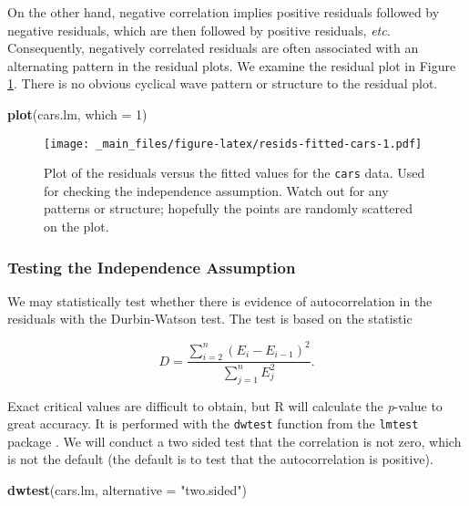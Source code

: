 \documentclass[]{book}
\newenvironment{Shaded}{\begin{snugshade}}{\end{snugshade}}
\newcommand{\KeywordTok}[1]{\textcolor[rgb]{0.13,0.29,0.53}{\textbf{{#1}}}}
\newcommand{\DataTypeTok}[1]{\textcolor[rgb]{0.13,0.29,0.53}{{#1}}}
\newcommand{\DecValTok}[1]{\textcolor[rgb]{0.00,0.00,0.81}{{#1}}}
\newcommand{\StringTok}[1]{\textcolor[rgb]{0.31,0.60,0.02}{{#1}}}
\newcommand{\NormalTok}[1]{{#1}}
\numberwithin{equation}{chapter}
\numberwithin{figure}{chapter}
\theoremstyle{plain}
\theoremstyle{definition}
\theoremstyle{remark}
\theoremstyle{definition}
\theoremstyle{definition}
\theoremstyle{remark}
\begin{document}
On the other hand, negative correlation implies positive residuals
followed by negative residuals, which are then followed by positive
residuals, \emph{etc}. Consequently, negatively correlated residuals are
often associated with an alternating pattern in the residual plots. We
examine the residual plot in Figure \ref{fig:resids-fitted-cars}. There
is no obvious cyclical wave pattern or structure to the residual plot.

\begin{Shaded}
\begin{Highlighting}[]
\KeywordTok{plot}\NormalTok{(cars.lm, }\DataTypeTok{which =} \DecValTok{1}\NormalTok{)}
\end{Highlighting}
\end{Shaded}

\begin{figure}[htbp]
\centering
\texttt{[image: \_main\_files/figure-latex/resids-fitted-cars-1.pdf]}
\caption{\label{fig:resids-fitted-cars}\small Plot of the residuals versus the
fitted values for the \texttt{cars} data. Used for checking the
independence assumption. Watch out for any patterns or structure;
hopefully the points are randomly scattered on the plot.}
\end{figure}






\subsubsection{Testing the Independence
Assumption}\label{testing-the-independence-assumption}

We may statistically test whether there is evidence of autocorrelation
in the residuals with the Durbin-Watson test. The test is based on the
statistic

\begin{equation}
D=\frac{\sum_{i=2}^{n}(E_{i}-E_{i-1})^{2}}{\sum_{j=1}^{n}E_{j}^{2}}.
\end{equation}

Exact critical values are difficult to obtain, but R will calculate the
\emph{p}-value to great accuracy. It is performed with the
\texttt{dwtest} function from the \texttt{lmtest} package
\autocite{lmtest}. We will conduct a two sided test that the correlation
is not zero, which is not the default (the default is to test that the
autocorrelation is positive).

\begin{Shaded}
\begin{Highlighting}[]
\KeywordTok{dwtest}\NormalTok{(cars.lm, }\DataTypeTok{alternative =} \StringTok{"two.sided"}\NormalTok{)}
\end{Highlighting}
\end{Shaded}
\end{document}

